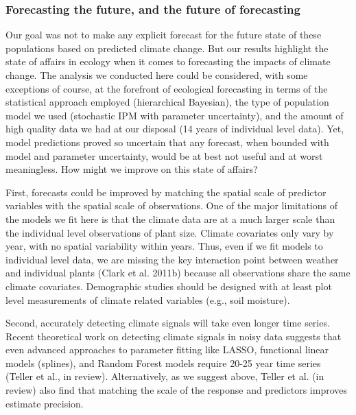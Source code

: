 \documentclass[12pt,]{article}
\begin{document}
\subsubsection{Forecasting the future, and the future of
forecasting}\label{forecasting-the-future-and-the-future-of-forecasting}

Our goal was not to make any explicit forecast for the future state of
these populations based on predicted climate change. But our results
highlight the state of affairs in ecology when it comes to forecasting
the impacts of climate change. The analysis we conducted here could be
considered, with some exceptions of course, at the forefront of
ecological forecasting in terms of the statistical approach employed
(hierarchical Bayesian), the type of population model we used
(stochastic IPM with parameter uncertainty), and the amount of high
quality data we had at our disposal (14 years of individual level data).
Yet, model predictions proved so uncertain that any forecast, when
bounded with model and parameter uncertainty, would be at best not
useful and at worst meaningless. How might we improve on this state of
affairs?

First, forecasts could be improved by matching the spatial scale of
predictor variables with the spatial scale of observations. One of the
major limitations of the models we fit here is that the climate data are
at a much larger scale than the individual level observations of plant
size. Climate covariates only vary by year, with no spatial variability
within years. Thus, even if we fit models to individual level data, we
are missing the key interaction point between weather and individual
plants (Clark et al. 2011b) because all observations share the same
climate covariates. Demographic studies should be designed with at least
plot level measurements of climate related variables (e.g., soil
moisture).

Second, accurately detecting climate signals will take even longer time
series. Recent theoretical work on detecting climate signals in noisy
data suggests that even advanced approaches to parameter fitting like
LASSO, functional linear models (splines), and Random Forest models
require 20-25 year time series (Teller et al., in review).
Alternatively, as we suggest above, Teller et al. (in review) also find
that matching the scale of the response and predictors improves estimate
precision.
\end{document}
